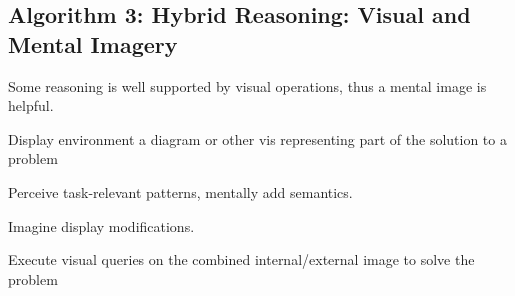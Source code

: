 \begin{mdframed}
\begin{multicols}{2}
\subsection{Algorithm 3: Hybrid Reasoning: Visual and Mental Imagery}
\begin{compactdesc}
\item[Some reasoning] is well supported by visual operations, thus a mental
    image is helpful.
\item[Display environment] a diagram or other vis representing part of the
    solution to a problem
\end{compactdesc}

\midrule\begin{compactenum}
\item Perceive task-relevant patterns, mentally add semantics.
\item Imagine display modifications.
\item Execute visual queries on the combined internal/external image to solve
    the problem
\end{compactenum}

\end{multicols}\end{mdframed}





